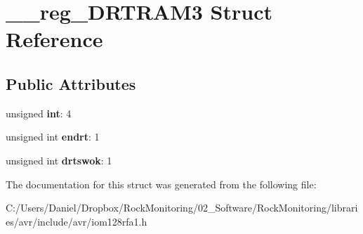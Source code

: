 \hypertarget{struct____reg___d_r_t_r_a_m3}{}\section{\+\_\+\+\_\+reg\+\_\+\+D\+R\+T\+R\+A\+M3 Struct Reference}
\label{struct____reg___d_r_t_r_a_m3}
\subsection*{Public Attributes}
\begin{DoxyCompactItemize}
\item 
unsigned {\bfseries int}\+: 4\hypertarget{struct____reg___d_r_t_r_a_m3_a30fa537a02ca0069eb64dd83ca07de7c}{}\label{struct____reg___d_r_t_r_a_m3_a30fa537a02ca0069eb64dd83ca07de7c}

\item 
unsigned int {\bfseries endrt}\+: 1\hypertarget{struct____reg___d_r_t_r_a_m3_a569eb4b1a0c405bb96350baabbeebe01}{}\label{struct____reg___d_r_t_r_a_m3_a569eb4b1a0c405bb96350baabbeebe01}

\item 
unsigned int {\bfseries drtswok}\+: 1\hypertarget{struct____reg___d_r_t_r_a_m3_a4b6be1bd911891c2fa8570f351533685}{}\label{struct____reg___d_r_t_r_a_m3_a4b6be1bd911891c2fa8570f351533685}

\end{DoxyCompactItemize}


The documentation for this struct was generated from the following file\+:\begin{DoxyCompactItemize}
\item 
C\+:/\+Users/\+Daniel/\+Dropbox/\+Rock\+Monitoring/02\+\_\+\+Software/\+Rock\+Monitoring/libraries/avr/include/avr/iom128rfa1.\+h\end{DoxyCompactItemize}
